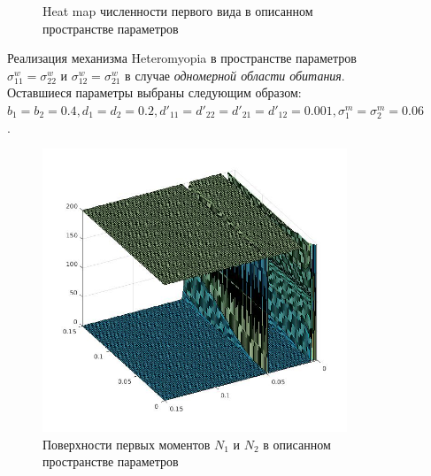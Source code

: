 \begin{figure}[ht]
\begin{subfigure}{.5\textwidth}
	\caption{Heat map численности первого вида в описанном пространстве параметров} 
	\label{fig:hmd1:sub4}
\end{subfigure}
	\caption{Реализация механизма Heteromyopia в пространстве параметров  $\sigma_{11}^{w}=\sigma_{22}^{w}$ и $\sigma_{12}^{w}=\sigma_{21}^{w}$ в случае \emph{одномерной области обитания}. Оставшиеся параметры выбраны следующим образом: $b_{1}=b_{2}=0.4
		, d_{1}=d_{2}=0.2
		, d'_{11}=d'_{22}=d'_{21}=d'_{12}=0.001,
		\sigma_{1}^{m}=\sigma_{2}^{m}=0.06$. }
	\label{fig:hmd1}
\end{figure}

\begin{figure}[ht]
	\centering
	\begin{subfigure}{.5\textwidth}
		\centering
		\includegraphics[width=.93\linewidth]{N1N2hm04D2.jpg}
		\caption{Поверхности первых моментов \(N_1\) и \(N_2\) в описанном пространстве параметров}
		\label{fig:hmd2:sub1}
	\end{subfigure}%
	\begin{subfigure}{.5\textwidth}
		\centering

\end{subfigure}
\end{figure}
